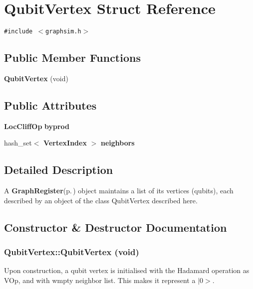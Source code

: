 \section{Qubit\-Vertex Struct Reference}
\label{structQubitVertex}
{\tt \#include $<$graphsim.h$>$}

\subsection*{Public Member Functions}
\begin{CompactItemize}
\item 
{\bf Qubit\-Vertex} (void)
\end{CompactItemize}
\subsection*{Public Attributes}
\begin{CompactItemize}
\item 
{\bf Loc\-Cliff\-Op} {\bf byprod}
\item 
hash\_\-set$<$ {\bf Vertex\-Index} $>$ {\bf neighbors}
\end{CompactItemize}


\subsection{Detailed Description}
A {\bf Graph\-Register}{\rm (p.\,\pageref{classGraphRegister})} object maintains a list of its vertices (qubits), each described by an object of the class Qubit\-Vertex described here. 



\subsection{Constructor \& Destructor Documentation}
\subsubsection{\setlength{\rightskip}{0pt plus 5cm}Qubit\-Vertex::Qubit\-Vertex (void)\hspace{0.3cm}{\tt  [inline]}}\label{structQubitVertex_a0}


Upon construction, a qubit vertex is initialised with the Hadamard operation as VOp, and with wmpty neighbor list. This makes it represent a $|$0$>$. 

